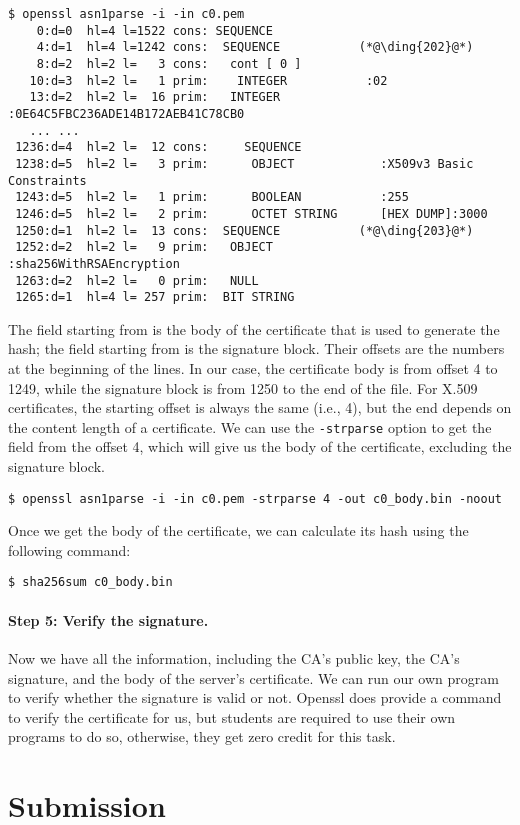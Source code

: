 \begin{lstlisting}
$ openssl asn1parse -i -in c0.pem
    0:d=0  hl=4 l=1522 cons: SEQUENCE          
    4:d=1  hl=4 l=1242 cons:  SEQUENCE           (*@\ding{202}@*)
    8:d=2  hl=2 l=   3 cons:   cont [ 0 ]        
   10:d=3  hl=2 l=   1 prim:    INTEGER           :02
   13:d=2  hl=2 l=  16 prim:   INTEGER           :0E64C5FBC236ADE14B172AEB41C78CB0
   ... ...
 1236:d=4  hl=2 l=  12 cons:     SEQUENCE          
 1238:d=5  hl=2 l=   3 prim:      OBJECT            :X509v3 Basic Constraints
 1243:d=5  hl=2 l=   1 prim:      BOOLEAN           :255
 1246:d=5  hl=2 l=   2 prim:      OCTET STRING      [HEX DUMP]:3000
 1250:d=1  hl=2 l=  13 cons:  SEQUENCE           (*@\ding{203}@*)
 1252:d=2  hl=2 l=   9 prim:   OBJECT            :sha256WithRSAEncryption
 1263:d=2  hl=2 l=   0 prim:   NULL              
 1265:d=1  hl=4 l= 257 prim:  BIT STRING        
\end{lstlisting}


The field starting from  is the body of the certificate that is used to generate the hash; the
field starting from  is the signature block. Their offsets are the numbers at the beginning 
of the lines. In our case, the certificate body is from offset 4 to 1249, while the 
signature block is from 1250 to the end of the file. For X.509 certificates, the starting
offset is always the same (i.e., 4), but the end depends on the content length of a
certificate.  We can use the 
\texttt{-strparse} option to get the field from the offset 4, which will give us the body of
the certificate, excluding the signature block.  

\begin{lstlisting}
$ openssl asn1parse -i -in c0.pem -strparse 4 -out c0_body.bin -noout
\end{lstlisting}

Once we get the body of the certificate, we can calculate its hash using the following
command: 

\begin{lstlisting}
$ sha256sum c0_body.bin
\end{lstlisting}



\paragraph{Step 5: Verify the signature.} 
Now we have all the information, including the CA's public key, the CA's signature, and the
body of the server's certificate. We can run our own program to verify whether the 
signature is valid or not. Openssl does provide a command to verify the certificate for
us, but students are required to use their own programs to do so, otherwise, they get zero
credit for this task. 


\section{Submission}





